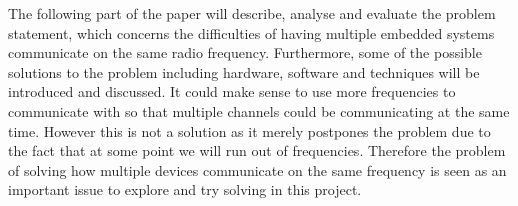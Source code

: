 \newpage
The following part of the paper will describe, analyse and evaluate the problem statement, which concerns the difficulties of having multiple embedded systems communicate on the same radio frequency.
Furthermore, some of the possible solutions to the problem including hardware, software and techniques will be introduced and discussed.
It could make sense to use more frequencies to communicate with so that multiple channels could be communicating at the same time.
However this is not a solution as it merely postpones the problem due to the fact that at some point we will run out of frequencies. 
Therefore the problem of solving how multiple devices communicate on the same frequency is seen as an important issue to explore and try solving in this project.